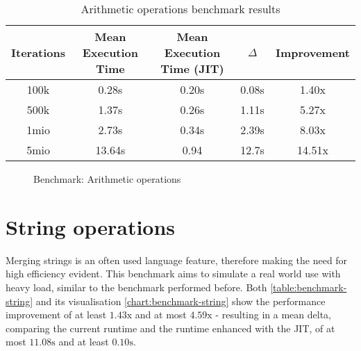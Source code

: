 \begin{table}[H]
    \centering
    \begin{tabular}{c|c|c|c|c}
        Iterations & Mean Execution Time & Mean Execution Time (JIT) & $\Delta$ & Improvement \\ 
        \hline
        100k & 0.28s & 0.20s & 0.08s & 1.40x \\ 
        500k & 1.37s & 0.26s & 1.11s & 5.27x \\
        1mio & 2.73s & 0.34s & 2.39s & 8.03x \\
        5mio & 13.64s & 0.94 & 12.7s & 14.51x \\
    \end{tabular}
    \caption{Arithmetic operations benchmark results }
\end{table}


\begin{figure}[H]
    \centering
    \caption{Benchmark: Arithmetic operations}
    \label{chart:arithmetic-benchmarks}
\end{figure}


\section{String operations}

Merging strings is an often used language feature, therefore making the need
for high efficiency evident. This benchmark aims to simulate a real world use
with heavy load, similar to the benchmark performed before. Both
\autoref{table:benchmark-string} and its visualisation
\autoref{chart:benchmark-string} show the performance improvement of at least
$1.43\textrm{x}$ and at most $4.59\textrm{x}$ - resulting in a mean delta,
comparing the current runtime and the runtime enhanced with the JIT, of at most
$11.08\textrm{s}$ and at least $0.10\textrm{s}$.

